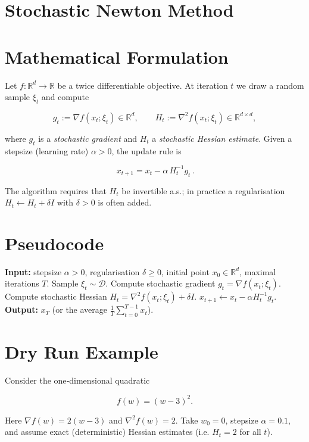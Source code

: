 \documentclass[11pt]{article}
\newcommand{\R}{\mathbb{R}}
\begin{document}
\section*{Stochastic Newton Method}

\section*{Mathematical Formulation}
Let $f:\R^{d}\rightarrow\R$ be a twice differentiable objective. 
At iteration $t$ we draw a random sample $\xi_{t}$ and compute  

\[
g_{t}:=\nabla f(x_{t};\xi_{t})\in\R^{d},\qquad 
H_{t}:=\nabla^{2} f(x_{t};\xi_{t})\in\R^{d\times d},
\]

where $g_{t}$ is a \emph{stochastic gradient} and $H_{t}$ a \emph{stochastic Hessian estimate}.  
Given a stepsize (learning rate) $\alpha>0$, the update rule is  

\[
\boxed{\,x_{t+1}=x_{t}-\alpha\,H_{t}^{-1}g_{t}\,}.
\]

The algorithm requires that $H_{t}$ be invertible a.s.; in practice a regularisation
$H_{t}\leftarrow H_{t}+ \delta I$ with $\delta>0$ is often added.

\section*{Pseudocode}
\begin{algorithm}[H]
\caption{Stochastic Newton Method}
\begin{algorithmic}[1]
\State \textbf{Input:} stepsize $\alpha>0$, regularisation $\delta\ge 0$, 
initial point $x_{0}\in\R^{d}$, maximal iterations $T$.
    \State Sample $\xi_{t}\sim\mathcal{D}$.
    \State Compute stochastic gradient $g_{t}= \nabla f(x_{t};\xi_{t})$.
    \State Compute stochastic Hessian $H_{t}= \nabla^{2} f(x_{t};\xi_{t})+\delta I$.
    \State $x_{t+1}\gets x_{t}-\alpha H_{t}^{-1}g_{t}$.
\EndFor
\State \textbf{Output:} $x_{T}$ (or the average $\frac1T\sum_{t=0}^{T-1}x_{t}$).
\end{algorithmic}
\end{algorithm}

\section*{Dry Run Example}
Consider the one‑dimensional quadratic  

\[
f(w)=(w-3)^{2}.
\]

Here $\nabla f(w)=2(w-3)$ and $\nabla^{2}f(w)=2$.  
Take $w_{0}=0$, stepsize $\alpha=0.1$, and assume exact (deterministic) Hessian
estimates (i.e. $H_{t}=2$ for all $t$).
\end{document}
